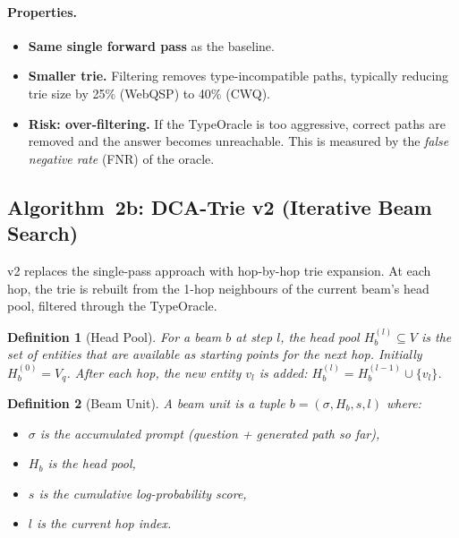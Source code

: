 \documentclass[11pt,a4paper]{article}
\newtheorem{definition}{Definition}
\begin{document}
\paragraph{Properties.}
\begin{itemize}
  \item \textbf{Same single forward pass} as the baseline.
  \item \textbf{Smaller trie.}  Filtering removes type-incompatible
    paths, typically reducing trie size by 25\% (WebQSP) to 40\% (CWQ).
  \item \textbf{Risk: over-filtering.}  If the TypeOracle is too
    aggressive, correct paths are removed and the answer becomes
    unreachable.  This is measured by the \emph{false negative rate}
    (FNR) of the oracle.
\end{itemize}

\subsection{Algorithm~2b: DCA-Trie v2 (Iterative Beam Search)}

v2 replaces the single-pass approach with hop-by-hop trie expansion.
At each hop, the trie is rebuilt from the 1-hop neighbours of the
current beam's head pool, filtered through the TypeOracle.

\begin{definition}[Head Pool]
For a beam $b$ at step $l$, the head pool $H_b^{(l)} \subseteq V$ is
the set of entities that are available as starting points for the next
hop.  Initially $H_b^{(0)} = V_q$.  After each hop, the new entity
$v_l$ is added: $H_b^{(l)} = H_b^{(l-1)} \cup \{v_l\}$.
\end{definition}

\begin{definition}[Beam Unit]
A beam unit is a tuple $b = (\sigma, H_b, s, l)$ where:
\begin{itemize}
  \item $\sigma$ is the accumulated prompt (question + generated path
    so far),
  \item $H_b$ is the head pool,
  \item $s$ is the cumulative log-probability score,
  \item $l$ is the current hop index.
\end{itemize}
\end{definition}
\end{document}
